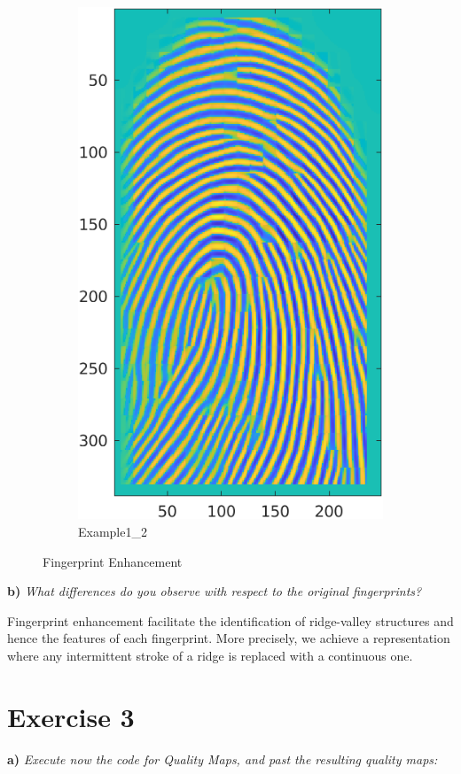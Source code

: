\documentclass[11pt]{article}
\begin{document}
\begin{figure}[h!]
\begin{subfigure}[t]{0.45\textwidth}
         \includegraphics[scale=1.0]{img/enhanced_2}
         \caption{Example1\_2}
     \end{subfigure}
    \caption{Fingerprint Enhancement}
\end{figure}


\textbf{b) }\emph{What differences do you observe with respect to the original fingerprints?}

Fingerprint enhancement facilitate the identification of ridge-valley structures and hence the features of each fingerprint. More precisely, we achieve a representation where any intermittent stroke of a ridge is replaced with a continuous one.

\section{Exercise 3}

\textbf{a) }\emph{Execute now the code for Quality Maps, and past the resulting quality maps:}
\end{document}
